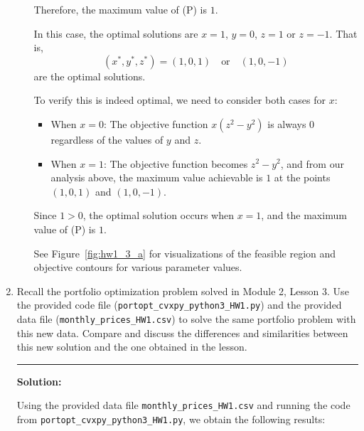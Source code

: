 \documentclass[11pt]{article}
\begin{document}
\begin{enumerate}[leftmargin=*, itemsep=1.5em]
\begin{enumerate}[leftmargin=*, itemsep=1.5em]
    Therefore, the maximum value of (P) is $1$.

    In this case, the optimal solutions are $x=1$, $y=0$, $z=1$ or $z=-1$. That is,
    \[
        (x^\ast, y^\ast, z^\ast) = (1, 0, 1) \quad \text{or} \quad (1, 0, -1)
    \]
    are the optimal solutions.

    To verify this is indeed optimal, we need to consider both cases for $x$:
    \begin{itemize}
        \item When $x=0$: The objective function $x(z^2 - y^2)$ is always $0$ regardless of the values of $y$ and $z$.
        \item When $x=1$: The objective function becomes $z^2 - y^2$, and from our analysis above, the maximum value achievable is $1$ at the points $(1, 0, 1)$ and $(1, 0, -1)$.
    \end{itemize}
    Since $1 > 0$, the optimal solution occurs when $x=1$, and the maximum value of (P) is $1$.

See Figure~\ref{fig:hw1_3_a} for visualizations of the feasible region and objective contours for various parameter values.

\end{enumerate}

\item Recall the portfolio optimization problem solved in Module 2, Lesson 3. Use the provided code file (\texttt{portopt\_cvxpy\_python3\_HW1.py}) and the provided data file (\texttt{monthly\_prices\_HW1.csv}) to solve the same portfolio problem with this new data. Compare and discuss the differences and similarities between this new solution and the one obtained in the lesson.

\vspace{0.5em}
\noindent\rule{\textwidth}{0.5pt}
\vspace{0.5em}

\noindent\textbf{Solution:}

Using the provided data file \texttt{monthly\_prices\_HW1.csv} and running the code from \texttt{portopt\_cvxpy\_python3\_HW1.py}, we obtain the following results:


\end{enumerate}
\end{document}
